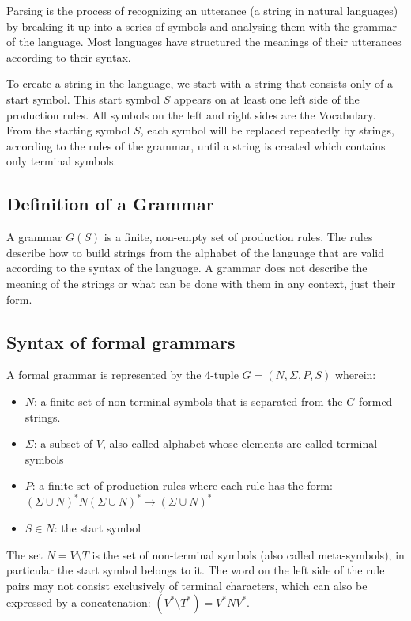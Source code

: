 Parsing is the process of recognizing an utterance (a string in natural languages) by breaking it up into a series of symbols and analysing them with the grammar of the language. Most languages have structured the meanings of their utterances according to their syntax.

To create a string in the language, we start with a string that consists only of a start symbol. This start symbol $S$ appears on at least one left side of the production rules. All symbols on the left and right sides are the Vocabulary.
From the starting symbol $S$, each symbol will be replaced repeatedly by strings, according to the rules of the grammar, until a string is created which contains only terminal symbols.

\subsection{Definition of a Grammar}
A grammar $G(S)$ is a finite, non-empty set of production rules. The rules describe how to build strings from the alphabet of the language that are valid according to the syntax of the language. A grammar does not describe the meaning of the strings or what can be done with them in any context, just their form.

\subsection{Syntax of formal grammars}
A formal grammar is represented by the 4-tuple $G=(N,\Sigma,P,S)$ wherein:
\begin{itemize}
\item $N$: a finite set of non-terminal symbols that is separated from the $G$ formed strings.
\item $\Sigma$: a subset of $V$, also called alphabet whose elements are called terminal symbols 
\item $P$: a finite set of production rules where each rule has the form: $(\Sigma \cup N)^{*}N(\Sigma \cup N)^{*}\rightarrow (\Sigma \cup N)^{*}$
\item $S \in N$: the start symbol
\end{itemize}
The set $N = V \setminus T$ is the set of non-terminal symbols (also called meta-symbols), in particular the start symbol belongs to it. The word on the left side of the rule pairs may not consist exclusively of terminal characters, which can also be expressed by a concatenation: $(V^* \setminus T^*) = V^*NV^*$.

